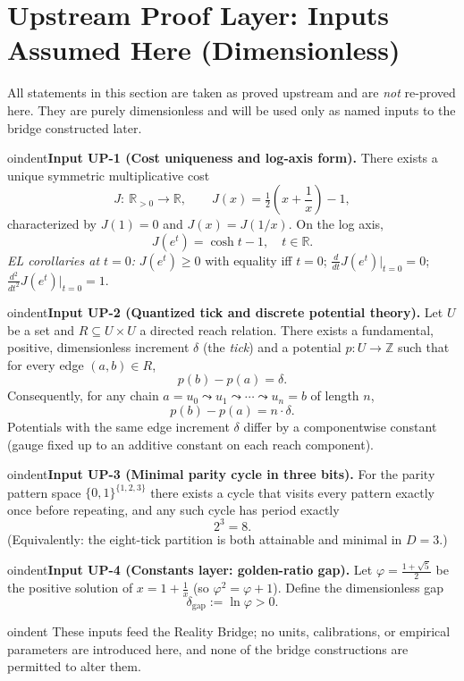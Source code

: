 \documentclass[11pt]{article}
\theoremstyle{plain}
\theoremstyle{definition}
\theoremstyle{remark}
\begin{document}
\section{Upstream Proof Layer: Inputs Assumed Here (Dimensionless)}
All statements in this section are taken as proved upstream and are \emph{not} re-proved here. They are purely dimensionless and will be used only as named inputs to the bridge constructed later.

\medskip

oindent\textbf{Input UP-1 (Cost uniqueness and log-axis form).}
There exists a unique symmetric multiplicative cost
\[
J:\ \mathbb{R}_{>0}\to\mathbb{R},\qquad
J(x)=\tfrac12\!\left(x+\frac{1}{x}\right)-1,
\]
characterized by \(J(1)=0\) and \(J(x)=J(1/x)\). On the log axis,
\[
J(e^{t})=\cosh t-1,\quad t\in\mathbb{R}.
\]
\emph{EL corollaries at \(t=0\):} \(J(e^{t})\ge 0\) with equality iff \(t=0\); \(\frac{d}{dt}J(e^{t})\big|_{t=0}=0\); \(\frac{d^{2}}{dt^{2}}J(e^{t})\big|_{t=0}=1\).

\medskip

oindent\textbf{Input UP-2 (Quantized tick and discrete potential theory).}
Let \(U\) be a set and \(R\subseteq U\times U\) a directed reach relation. There exists a fundamental, positive, dimensionless increment \(\delta\) (the \emph{tick}) and a potential \(p:U\to\mathbb{Z}\) such that for every edge \((a,b)\in R\),
\[
p(b)-p(a)=\delta.
\]
Consequently, for any chain \(a=u_{0}\leadsto u_{1}\leadsto\cdots\leadsto u_{n}=b\) of length \(n\),
\[
p(b)-p(a)=n\cdot\delta.
\]
Potentials with the same edge increment \(\delta\) differ by a componentwise constant (gauge fixed up to an additive constant on each reach component).

\medskip

oindent\textbf{Input UP-3 (Minimal parity cycle in three bits).}
For the parity pattern space \(\{0,1\}^{\{1,2,3\}}\) there exists a cycle that visits every pattern exactly once before repeating, and any such cycle has period exactly
\[
2^{3}=8.
\]
(Equivalently: the eight-tick partition is both attainable and minimal in \(D=3\).)

\medskip

oindent\textbf{Input UP-4 (Constants layer: golden-ratio gap).}
Let \(\varphi=\tfrac{1+\sqrt{5}}{2}\) be the positive solution of \(x=1+\tfrac{1}{x}\) (so \(\varphi^{2}=\varphi+1\)). Define the dimensionless gap
\[
\delta_{\mathrm{gap}}:=\ln\varphi>0.
\]

\medskip

oindent These inputs feed the Reality Bridge; no units, calibrations, or empirical parameters are introduced here, and none of the bridge constructions are permitted to alter them.
\end{document}
